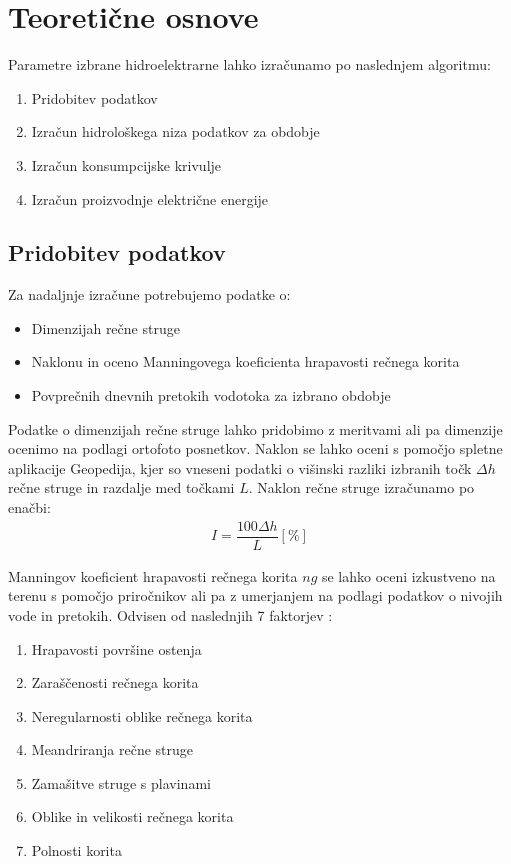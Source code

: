 \chapter{Teoretične osnove}

Parametre izbrane hidroelektrarne lahko izračunamo po naslednjem algoritmu:
\begin{enumerate}[noitemsep, topsep=0pt]
	\item Pridobitev podatkov
	\item Izračun hidrološkega niza podatkov za obdobje
	\item Izračun konsumpcijske krivulje
	\item Izračun proizvodnje električne energije
\end{enumerate}


\section{Pridobitev podatkov}
Za nadaljnje izračune potrebujemo podatke o:
\begin{itemize}[noitemsep, topsep=0pt]
	\item Dimenzijah rečne struge
	\item Naklonu in oceno Manningovega koeficienta hrapavosti rečnega korita
	\item Povprečnih dnevnih pretokih vodotoka za izbrano obdobje
\end{itemize}

Podatke o dimenzijah rečne struge lahko pridobimo z meritvami ali pa dimenzije ocenimo na podlagi ortofoto posnetkov. Naklon se lahko oceni s pomočjo spletne aplikacije Geopedija, kjer so vneseni podatki o višinski razliki izbranih točk $\Delta h$ rečne struge in razdalje med točkami $L$. Naklon rečne struge izračunamo po enačbi:
\begin{align}
 I = \dfrac{100\Delta h}{L} [\%]
\end{align}


  Manningov koeficient hrapavosti rečnega korita $ng$ se lahko oceni izkustveno na terenu s pomočjo priročnikov ali pa z umerjanjem na podlagi podatkov o nivojih vode in pretokih. Odvisen od naslednjih 7 faktorjev \cite{VenTeChow}:
 \begin{enumerate}[noitemsep, topsep=0pt]
 	\item Hrapavosti površine ostenja
 	\item Zaraščenosti rečnega korita
 	\item Neregularnosti oblike rečnega korita
 	\item Meandriranja rečne struge
 	\item Zamašitve struge s plavinami 
 	\item Oblike in velikosti rečnega korita
 	\item Polnosti korita
 \end{enumerate}
 

